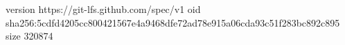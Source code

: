version https://git-lfs.github.com/spec/v1
oid sha256:5cdfd4205cc800421567e4a9468dfe72ad78e915a06cda93c51f283bc892c895
size 320874
